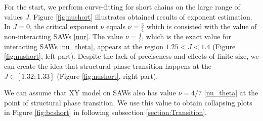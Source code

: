 For the start, we perform curve-fitting for short chains on the large range of values $J$. Figure \ref{fig:nushort} illustrates obtained results of exponent estimation. In $J=0$, the critical exponent $\nu$ equals $\nu = \frac{3}{4}$  which is consisted with the value of non-interacting SAWs \eqref{nur}. The value $\nu=\frac{4}{7}$, which is the exact value
for interacting SAWs \eqref{nu_theta}, appears at the region $ 1.25 < J < 1.4$ (Figure \ref{fig:nushort}, left part). Despite the lack of preciseness and effects of finite size, we can create the idea that structural phase transition happens at the $J \in [1.32; 1.33]$ (Figure \ref{fig:nushort}, right part).  %

  We can assume that XY model on SAWs also has value $\nu = 4/7$ \eqref{nu_theta} at the point of structural phase transition. We use this value to obtain collapsing plots in Figure \ref{fig:bcshort} in following subsection \ref{section:Transition}. 


